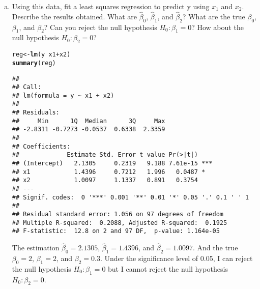 \documentclass[12pt]{article}\usepackage[]{graphicx}\usepackage[]{color}
\makeatletter
\newcommand{\hlopt}[1]{\textcolor[rgb]{0,0,0}{#1}}%
\newcommand{\hlstd}[1]{\textcolor[rgb]{0.345,0.345,0.345}{#1}}%
\newcommand{\hlkwb}[1]{\textcolor[rgb]{0.69,0.353,0.396}{#1}}%
\newcommand{\hlkwd}[1]{\textcolor[rgb]{0.737,0.353,0.396}{\textbf{#1}}}%
\newenvironment{kframe}{%
 \def\at@end@of@kframe{}%
 \ifinner\ifhmode%
  \def\at@end@of@kframe{\end{minipage}}%
  \begin{minipage}{\columnwidth}%
 \fi\fi%
 \def\FrameCommand##1{\hskip\@totalleftmargin \hskip-\fboxsep
 \colorbox{shadecolor}{##1}\hskip-\fboxsep
     \hskip-\linewidth \hskip-\@totalleftmargin \hskip\columnwidth}%
 \MakeFramed {\advance\hsize-\width
   \@totalleftmargin\z@ \linewidth\hsize
   \@setminipage}}%
 {\par\unskip\endMakeFramed%
 \at@end@of@kframe}
\newenvironment{knitrout}{}{} %
\theoremstyle{definition}
\makeatother
\begin{document}
\begin{enumerate}[1.]
\begin{enumerate}[(a)]
\begin{knitrout}
\end{knitrout}

      \item Using this data, fit a least squares regression to predict y using $x_1$ and $x_2$. Describe the results obtained. What are $\hat{\beta}_0$, $\hat{\beta}_1$, and $\hat{\beta}_2$? What are the true $\beta_0$, $\beta_1$, and $\beta_2$? Can you reject the null hypothesis $H_0 : \beta_1 = 0$? How about the null hypothesis $H_0 : \beta_2 = 0$?
\begin{knitrout}
\color{fgcolor}\begin{kframe}
\begin{alltt}
\hlstd{reg} \hlkwb{<-} \hlkwd{lm}\hlstd{(y} \hlopt{~} \hlstd{x1} \hlopt{+} \hlstd{x2)}
\hlkwd{summary}\hlstd{(reg)}
\end{alltt}
\begin{verbatim}
## 
## Call:
## lm(formula = y ~ x1 + x2)
## 
## Residuals:
##     Min      1Q  Median      3Q     Max 
## -2.8311 -0.7273 -0.0537  0.6338  2.3359 
## 
## Coefficients:
##             Estimate Std. Error t value Pr(>|t|)    
## (Intercept)   2.1305     0.2319   9.188 7.61e-15 ***
## x1            1.4396     0.7212   1.996   0.0487 *  
## x2            1.0097     1.1337   0.891   0.3754    
## ---
## Signif. codes:  0 '***' 0.001 '**' 0.01 '*' 0.05 '.' 0.1 ' ' 1
## 
## Residual standard error: 1.056 on 97 degrees of freedom
## Multiple R-squared:  0.2088,	Adjusted R-squared:  0.1925 
## F-statistic:  12.8 on 2 and 97 DF,  p-value: 1.164e-05
\end{verbatim}
\end{kframe}
\end{knitrout}
      The estimation $\hat{\beta}_0 = 2.1305$, $\hat{\beta}_1 = 1.4396$, and $\hat{\beta}_2 = 1.0097$. And the true $\beta_0 = 2$, $\beta_1 = 2$, and $\beta_2 = 0.3$. Under the significance level of 0.05, I can reject the null hypothesis $H_0 : \beta_1 = 0$ but I cannot reject the null hypothesis $H_0 : \beta_2 = 0$.


\end{enumerate}
\end{enumerate}
\end{document}
